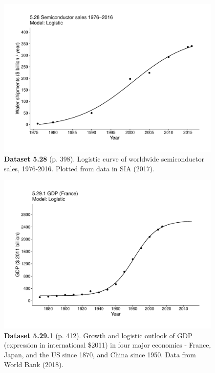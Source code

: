 \documentclass[aps,rmp,preprint,superscriptaddress,10pt,onecolumn]{article}
\begin{document}
\clearpage
\begin{figure}[h]
\includegraphics[width=\textwidth]{output/figs-ggplot/5.28.pdf}
\caption*{\textbf{Dataset 5.28} (p. 398). Logistic curve of worldwide semiconductor sales, 1976-2016. Plotted from data in SIA (2017).}
\end{figure}
	
\clearpage
\begin{figure}[h]
\includegraphics[width=\textwidth]{output/figs-ggplot/5.29.1.pdf}
\caption*{\textbf{Dataset 5.29.1} (p. 412). Growth and logistic outlook of GDP (expression in international \$2011) in four major economies - France, Japan, and the US since 1870, and China since 1950. Data from World Bank (2018).}
\end{figure}
	
\end{document}
